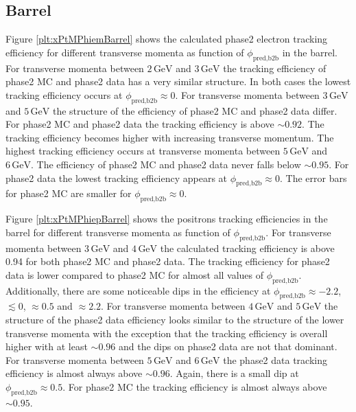 \documentclass[a4paper,11pt,twosided,final,german,openbib,pdftex,listof=totoc,bibliography=totoc]{scrbook}
\begin{document}
\newpage

\subsection{Barrel}

Figure \ref{plt:xPtMPhiemBarrel} shows the calculated phase2 electron tracking efficiency for different transverse momenta as function of $\phi_{\textrm{pred,b2b}}$ in the barrel. For transverse momenta between $2\,\textrm{GeV}$ and $3\,\textrm{GeV}$ the tracking efficiency of phase2 MC and phase2 data has a very similar structure. In both cases the lowest tracking efficiency occurs at $\phi_{\textrm{pred,b2b}} \approx 0$. 
For transverse momenta between $3\,\textrm{GeV}$ and $5\,\textrm{GeV}$ the structure of the efficiency of phase2 MC and phase2 data differ. For phase2 MC and phase2 data the tracking efficiency is above $\sim 0.92$. The tracking efficiency becomes higher with increasing transverse momentum. The highest tracking efficiency occurs at transverse momenta between $5\,\textrm{GeV}$ and $6\,\textrm{GeV}$. The efficiency of phase2 MC and phase2 data never falls below $\sim 0.95$. 
For phase2 data the lowest tracking efficiency appears at $\phi_{\textrm{pred,b2b}} \approx 0$. The error bars for phase2 MC are smaller for $\phi_{\textrm{pred,b2b}} \approx 0$.


Figure \ref{plt:xPtMPhiepBarrel} shows the positrons tracking efficiencies in the barrel for different transverse momenta as function of $\phi_{\textrm{pred,b2b}}$. 
For transverse momenta between $3\,\textrm{GeV}$ and $4\,\textrm{GeV}$ the calculated tracking efficiency is above 0.94 for both phase2 MC and phase2 data. The tracking efficiency for phase2 data is lower compared to phase2 MC for almost all values of $\phi_{\textrm{pred,b2b}}$. Additionally, there are some noticeable dips in the efficiency at $\phi_{\textrm{pred,b2b}} \approx -2.2$, $ \lesssim 0$, $ \approx 0.5$ and $ \approx 2.2$. 
For transverse momenta between $4\,\textrm{GeV}$ and $5\,\textrm{GeV}$ the structure of the phase2 data efficiency looks similar to the structure of the lower transverse momenta with the exception that the tracking efficiency is overall higher with at least $\sim 0.96$ and the dips on phase2 data are not that dominant. 
For transverse momenta between $5\,\textrm{GeV}$ and $6\,\textrm{GeV}$ the phase2 data tracking efficiency is almost always above $\sim 0.96$. Again, there is a small dip at $\phi_{\textrm{pred,b2b}} \approx 0.5$. For phase2 MC the tracking efficiency is almost always above $\sim 0.95$. 
\end{document}
